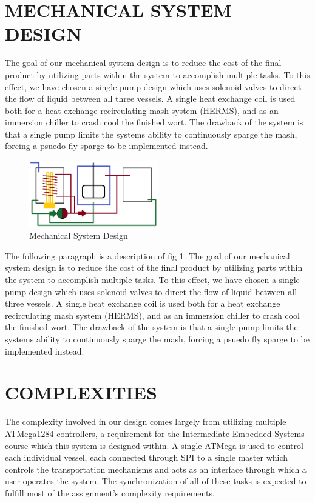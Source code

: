 \documentclass[letterpaper, 10 pt, conference]{ieeeconf}  %
\begin{document}
\section{MECHANICAL SYSTEM DESIGN}

The goal of our mechanical system design is to reduce the cost of the final product by utilizing parts within the system to accomplish multiple tasks. To this effect, we have chosen a single pump design which uses solenoid valves to direct the flow of liquid between all three vessels. A single heat exchange coil is used both for a heat exchange recirculating mash system (HERMS), and as an immersion chiller to crash cool the finished wort. The drawback of the system is that a single pump limits the systems ability to continuously sparge the mash, forcing a psuedo fly sparge to be implemented instead.

\begin{figure}[!htb]
  \includegraphics[width=0.5\textwidth]{3vbs}
  \caption{Mechanical System Design}
\end{figure}

The following paragraph is a description of fig 1. The goal of our mechanical system design is to reduce the cost of the final product by utilizing parts within the system to accomplish multiple tasks. To this effect, we have chosen a single pump design which uses solenoid valves to direct the flow of liquid between all three vessels. A single heat exchange coil is used both for a heat exchange recirculating mash system (HERMS), and as an immersion chiller to crash cool the finished wort. The drawback of the system is that a single pump limits the systems ability to continuously sparge the mash, forcing a psuedo fly sparge to be implemented instead.

\section{COMPLEXITIES}

The complexity involved in our design comes largely from utilizing multiple ATMega1284 controllers, a requirement for the Intermediate Embedded Systems course which this system is designed within. A single ATMega is used to control each individual vessel, each connected through SPI to a single master which controls the transportation mechanisms and acts as an interface through which a user operates the system. The synchronization of all of these tasks is expected to fulfill most of the assignment's complexity requirements.
\end{document}
